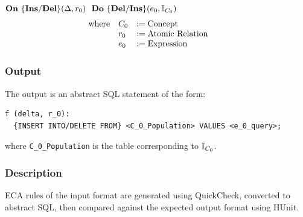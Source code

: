 \documentclass[12pt]{report}
\begin{document}
$\mathbf{On~} \mathbf{\{Ins/Del\}}(\Delta,r_0) \,\,\,\,\mathbf{Do~} \mathbf{\{Del/Ins\}}(e_0,\mathbb{I}_{C_0}) $
\vspace{-10pt}\[\hspace{-20pt}\begin{array}{lll}
\text{where} & C_0 & := \text{Concept} \\ 
             & r_0 & := \text{Atomic Relation}\\ 
             & e_0 & := \text{Expression}\\ 
\end{array}\]

\vspace{-12pt}\subsubsection*{Output}

The output is an abstract SQL statement of the form:
\begin{verbatim}
f (delta, r_0):
  {INSERT INTO/DELETE FROM} <C_0_Population> VALUES <e_0_query>;
\end{verbatim}

\noindent where \verb|C_0_Population| is the table corresponding to $\mathbb{I}_{C_0}$. 

\vspace{-12pt}\subsubsection*{Description}

ECA rules of the input format are generated using QuickCheck, converted to
  abstract SQL, then compared against the expected output format using HUnit.




\end{document}
